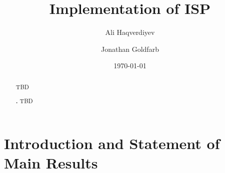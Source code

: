 \documentclass[letterpaper, 10pt]{amsart}
\let\institute\address%
\theoremstyle{definition}
\theoremstyle{remark}
\begin{document}
\title{Implementation of ISP}
\author{Ali Haqverdiyev \and Jonathan Goldfarb}
\institute{Department of Mathematical Sciences\\Florida Institute of
    Technology\\Melbourne, FL 32901}
\date{\today}

\begin{abstract}
    TBD

    \smallskip%
    \noindent\textbf{\keywordsname.} TBD
\end{abstract}
\maketitle

\tableofcontents{}

\section{Introduction and Statement of Main Results}\label{sec:introduction}
\end{document}
